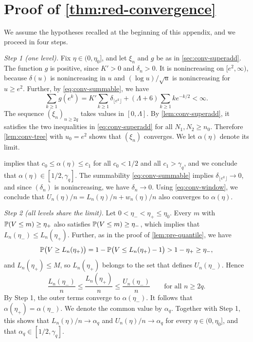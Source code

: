 \section{Proof of \texorpdfstring{\cref{thm:red-convergence}}{the convergence theorem}}\label{sec:conv-proof}

We assume the hypotheses recalled at the beginning of this appendix, and we proceed in four steps.

\emph{Step 1 (one level).} Fix $\eta \in (0, \eta_0]$, and let $\xi_n$ and $g$ be as in \cref{sec:conv-superadd}. The function $g$ is positive, since $K' > 0$ and $\delta_n > 0$. It is nonincreasing on $[e^2, \infty)$, because $\delta(u)$ is nonincreasing in $u$ and $(\log u)/\sqrt u$ is nonincreasing for $u \ge e^2$. Further, by \eqref{eq:conv-summable}, we have
\[
\sum_{k \ge 1} g(e^k) = K' \sum_{k \ge 1} \delta_{\lfloor e^k \rfloor} + (\Lambda + 6) \sum_{k \ge 1} k e^{-k/2} < \infty.
\]
The sequence $(\xi_n)_{n \ge 2q}$ takes values in $[0, \Lambda]$. By \cref{lem:conv-superadd}, it satisfies the two inequalities in \eqref{eq:conv-superadd} for all $N_1, N_2 \ge n_0$. Therefore \cref{lem:conv-tree} with $u_0 = e^2$ shows that $(\xi_n)$ converges. We let $\alpha(\eta)$ denote its limit.

 implies that $c_0 \le \alpha(\eta) \le c_1$ for all $c_0 < 1/2$ and all $c_1 > \gamma_q$, and we conclude that $\alpha(\eta) \in [1/2, \gamma_q]$. The summability \eqref{eq:conv-summable} implies $\delta_{\lfloor e^k \rfloor} \to 0$, and since $(\delta_n)$ is nonincreasing, we have $\delta_n \to 0$. Using \eqref{eq:conv-window}, we conclude that $U_n(\eta)/n = L_n(\eta)/n + w_n(\eta)/n$ also converges to $\alpha(\eta)$.

\emph{Step 2 (all levels share the limit).} Let $0 < \eta_- < \eta_+ \le \eta_0$. Every $m$ with $\mathbb P(V \le m) \ge \eta_+$ also satisfies $\mathbb P(V \le m) \ge \eta_-$, which implies that $L_n(\eta_-) \le L_n(\eta_+)$. Further, as in the proof of \cref{lem:pre-quantile}, we have
\[
\mathbb P\big(V \ge L_n(\eta_+)\big) = 1 - \mathbb P\big(V \le L_n(\eta_+) - 1\big) > 1 - \eta_+ \ge \eta_-,
\]
and $L_n(\eta_+) \le M$, so $L_n(\eta_+)$ belongs to the set that defines $U_n(\eta_-)$. Hence
\[
\frac{L_n(\eta_-)}{n} \le \frac{L_n(\eta_+)}{n} \le \frac{U_n(\eta_-)}{n} \qquad \text{for all } n \ge 2q.
\]
By Step 1, the outer terms converge to $\alpha(\eta_-)$. It follows that $\alpha(\eta_+) = \alpha(\eta_-)$. We denote the common value by $\alpha_q$. Together with Step 1, this shows that $L_n(\eta)/n \to \alpha_q$ and $U_n(\eta)/n \to \alpha_q$ for every $\eta \in (0, \eta_0]$, and that $\alpha_q \in [1/2, \gamma_q]$.

